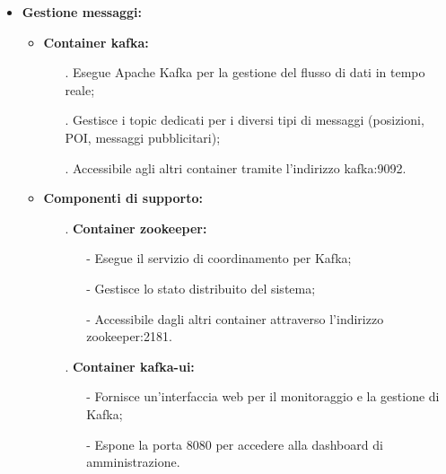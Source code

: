 \documentclass[10pt]{article}
\begin{document}
\begin{itemize}
    \item \textbf{Gestione messaggi:}
    \begin{itemize}
        \item \textbf{Container kafka:}
        \begin{itemize}
            \item[.] Esegue Apache Kafka per la gestione del flusso di dati in tempo reale;
            \item[.] Gestisce i topic dedicati per i diversi tipi di messaggi (posizioni, POI, messaggi pubblicitari);
            \item[.] Accessibile agli altri container tramite l'indirizzo kafka:9092.
        \end{itemize}
        \item \textbf{Componenti di supporto:}
        \begin{itemize}
            \item[.] \textbf{Container zookeeper:}
            \begin{itemize}
                \item[-] Esegue il servizio di coordinamento per Kafka;
                \item[-] Gestisce lo stato distribuito del sistema;
                \item[-] Accessibile dagli altri container attraverso l'indirizzo zookeeper:2181.
            \end{itemize}
            \item[.] \textbf{Container kafka-ui:}
            \begin{itemize}
                \item[-] Fornisce un'interfaccia web per il monitoraggio e la gestione di Kafka;
                \item[-] Espone la porta 8080 per accedere alla dashboard di amministrazione.
            \end{itemize}
        \end{itemize}
    \end{itemize}
    

\end{itemize}
\end{document}
